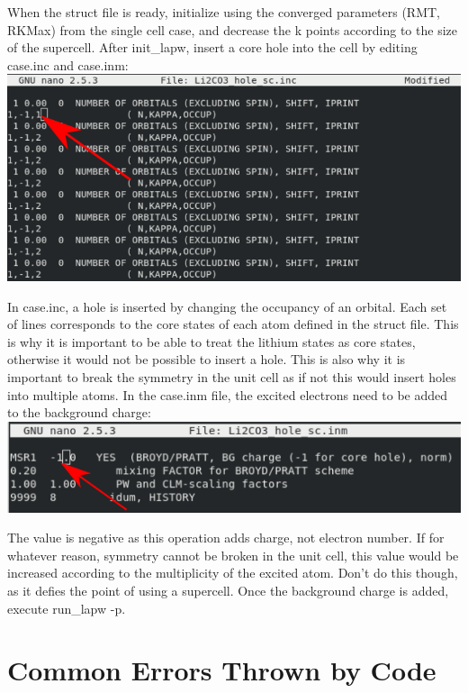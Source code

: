 \documentclass[12pt]{article}
\begin{document}
When the struct file is ready, initialize using the converged parameters (RMT, RKMax) from the single cell case, and decrease the k points according to the size of the supercell.  After init\_lapw, insert a core hole into the cell by editing case.inc and case.inm: \\

\includegraphics[scale=0.5]{./images/hole_inc.png}

In case.inc, a hole is inserted by changing the occupancy of an orbital.  Each set of lines corresponds to the core states of each atom defined in the struct file.  This is why it is important to be able to treat the lithium states as core states, otherwise it would not be possible to insert a hole.  This is also why it is important to break the symmetry in the unit cell as if not this would insert holes into multiple atoms. In the case.inm file, the excited electrons need to be added to the background charge: \\

\includegraphics[scale=0.5]{./images/hole_inm.png}

The value is negative as this operation adds charge, not electron number.  If for whatever reason, symmetry cannot be broken in the unit cell, this value would be increased according to the multiplicity of the excited atom.  Don't do this though, as it defies the point of using a supercell.   Once the background charge is added, execute run\_lapw -p.  





\section{Common Errors Thrown by Code}
\end{document}
